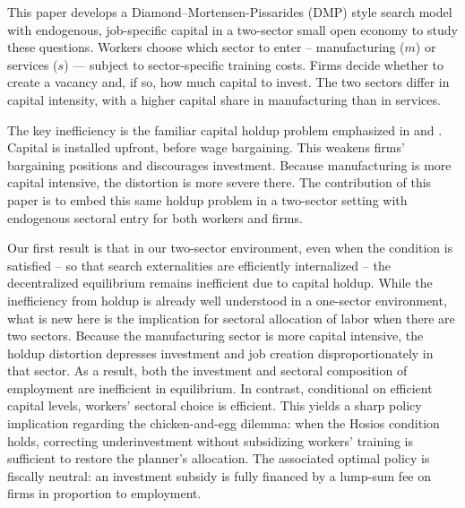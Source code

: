 \documentclass[12pt]{article} %
\theoremstyle{definition}
\begin{document}
This paper develops a Diamond–Mortensen-Pissarides (DMP) style search model with endogenous, job-specific capital in a two-sector small open economy to study these questions.   Workers choose which sector to enter -- manufacturing ($m$) or services ($s$) --- subject to sector-specific training costs. 
Firms decide whether to create a vacancy and, if so, how much capital to invest. The two sectors differ in capital intensity, with a higher capital share in manufacturing than in services.

The key inefficiency is the familiar capital holdup problem emphasized in  \cite{grout1984investment} and \cite{acemoglu1999holdups}. Capital is installed upfront, before wage bargaining. %
This weakens firms' bargaining positions and discourages investment. Because manufacturing is more capital intensive, the distortion is more severe there. 
The contribution of this paper is to embed this same holdup problem in a two-sector setting with endogenous sectoral entry for both workers and firms. 

Our first result is that in our two-sector environment, even when the \cite{Hosios1990} condition is satisfied -- so that search externalities are efficiently internalized --  the decentralized equilibrium remains inefficient due to capital holdup.  %
While the inefficiency from holdup is already well understood in a one-sector environment, what is new here is the implication for sectoral allocation of labor when there are two sectors. Because the manufacturing sector is more capital intensive, the holdup distortion depresses investment and job creation disproportionately in that sector. As a result, both the investment and sectoral composition of employment are inefficient in equilibrium. In contrast, 
  conditional on efficient capital levels, workers' sectoral choice is efficient.  
This yields a sharp policy implication regarding the chicken-and-egg dilemma:  when the Hosios condition holds, correcting underinvestment without subsidizing workers' training is sufficient to restore the planner's allocation.  The associated optimal policy is fiscally neutral: an investment subsidy is fully financed by a lump-sum fee on firms in proportion to employment. 
\end{document}

